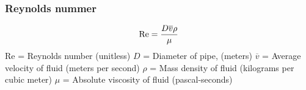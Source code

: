 \documentclass[aspectratio=169,xcolor=dvipsnames]{beamer}
\begin{document}
\begin{frame}
	\frametitle{Reynolds nummer}

	


%
%
%
%
$$\hbox{Re} = {{D \overline{v} \rho} \over \mu}$$
%
%
Re = Reynolds number (unitless)
%
$D$ = Diameter of pipe, (meters)
%
$\overline{v}$ = Average velocity of fluid (meters per second)
%
$\rho$ = Mass density of fluid (kilograms per cubic meter)
%
$\mu$ = Absolute viscosity of fluid (pascal-seconds)
%
\end{frame}
%
%
%
%
%
%
%
%
%
%
%
%
%
%
%
%
\end{document}
